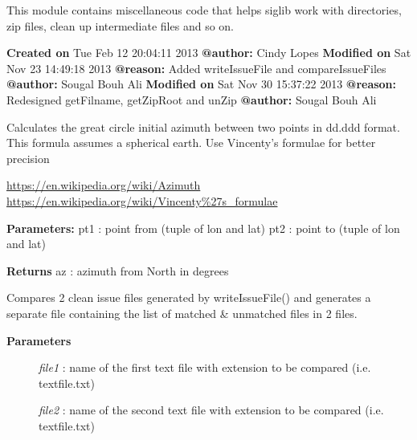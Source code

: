 \documentclass[letterpaper,10pt,english]{sphinxmanual}
\begin{document}
This module contains miscellaneous code that helps siglib work with directories, 
zip files, clean up intermediate files and so on.

\textbf{Created on} Tue Feb 12 20:04:11 2013 \textbf{@author:} Cindy Lopes
\textbf{Modified on} Sat Nov 23 14:49:18 2013 \textbf{@reason:} Added writeIssueFile and compareIssueFiles \textbf{@author:} Sougal Bouh Ali
\textbf{Modified on} Sat Nov 30 15:37:22 2013 \textbf{@reason:} Redesigned getFilname, getZipRoot and unZip \textbf{@author:} Sougal Bouh Ali

\begin{fulllineitems}
\label{code:Util.az}
Calculates the great circle initial azimuth between two points
in dd.ddd format. 
This formula assumes a spherical earth.  Use Vincenty's formulae
for better precision

\href{https://en.wikipedia.org/wiki/Azimuth}{https://en.wikipedia.org/wiki/Azimuth}
\href{https://en.wikipedia.org/wiki/Vincenty\%27s\_formulae}{https://en.wikipedia.org/wiki/Vincenty\%27s\_formulae}

\textbf{Parameters:}
pt1 : point from (tuple of lon and lat)
pt2 : point to (tuple of lon and lat)

\textbf{Returns}
az : azimuth from North in degrees

\end{fulllineitems}


\begin{fulllineitems}
\label{code:Util.compareIssueFiles}
Compares 2 clean issue files generated by writeIssueFile() and
generates a separate file containing the list of matched \& unmatched files in 2 files.
\begin{description}
\item[{\textbf{Parameters}}] \leavevmode
\emph{file1}     :   name of the first text file with extension to be compared (i.e. textfile.txt)

\emph{file2}     :   name of the second text file with extension to be compared (i.e. textfile.txt)

\end{description}

\end{fulllineitems}
\end{document}
